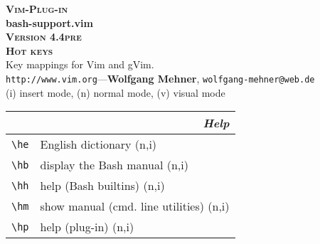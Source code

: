 \documentclass[oneside,11pt,landscape,DIV16]{scrartcl}
\newcommand{\Pluginversion}{4.4pre}
\begin{document}
%

\begin{multicols}{3}
%
\begin{center}
%
\textbf{\textsc{\small{Vim-Plug-in}}}\\
\textbf{\LARGE{bash-support.vim}}\\
\textbf{\textsc{\small{Version \Pluginversion}}}\\
\vspace{1mm}%
\textbf{\textsc{\Huge{Hot keys}}}\\ 
\vspace{1mm}%
Key mappings for Vim and gVim.\\
{\tiny  \texttt{http://www.vim.org}\hspace{1.5mm}---\hspace{1.5mm}\textbf{Wolfgang Mehner},  \texttt{wolfgang-mehner@web.de}}\\
\vspace{1.0mm}
{\normalsize (i)} insert mode, {\normalsize (n)} normal mode, {\normalsize (v)} visual mode\\
\vspace{1.0mm}
%
\begin{tabular}[]{|p{11mm}|p{60mm}|}
\hline
\multicolumn{2}{|r|}{\textsl{\textbf{H}elp}}\\[1.0ex]
\hline \verb'\he'   & English dictionary                \hfill (n,i)\\
\hline \verb'\hb'   & display the Bash manual           \hfill (n,i)\\
\hline \verb'\hh'   & help (Bash builtins)              \hfill (n,i)\\
\hline \verb'\hm'   & show manual (cmd. line utilities) \hfill (n,i)\\
\hline \verb'\hp'   & help (plug-in)                    \hfill (n,i)\\
\hline

\end{tabular}
\end{center}
\end{multicols}
\end{document}
